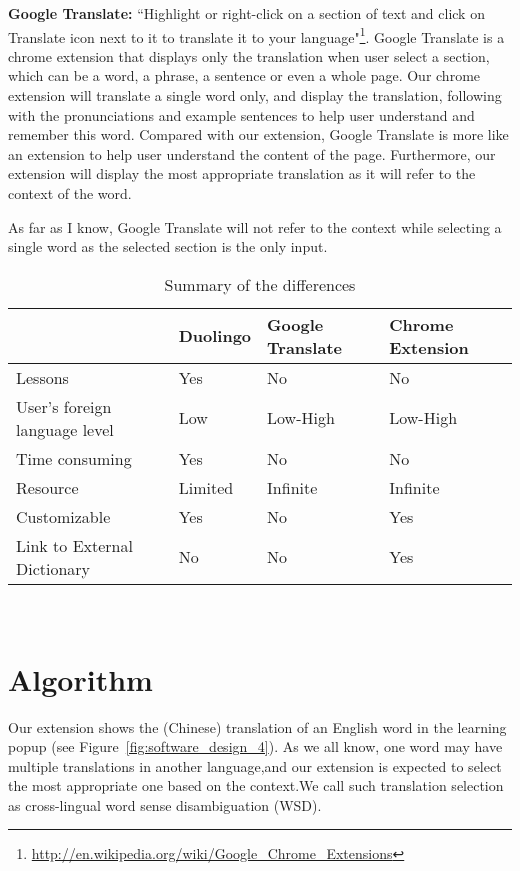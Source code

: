 \documentclass[11pt]{article}
\begin{document}
\textbf{Google Translate:} ``Highlight or right-click on a section of text and click on Translate icon next to it to translate it to your 
language"\footnote{\url{http://en.wikipedia.org/wiki/Google_Chrome_Extensions}}. %
Google Translate is a chrome extension that displays only the translation when user select a section, which can be a word, a phrase, a 
sentence or even a whole page. Our chrome extension will translate a single word only, and display the translation, following with the 
pronunciations and example sentences to help user understand and remember this word. Compared with our extension, Google Translate is more 
like an extension to help user understand the content of the page. Furthermore, our extension will display the most appropriate translation 
as it will refer to the context of the word.

As far as I know, Google Translate will not refer to the context while selecting a single word as the selected section is the only input.
\\
\begin{table}[ht]
  \caption{Summary of the differences}
  \label{table:difference_summary}
  \begin{center}
  \begin{tabular}{| p{2.4cm} | p{1.2cm} | p{1.2cm} |  p{1.2cm} |}
    \hline
    & Duolingo & Google Translate & Chrome Extension \\
    \hline
    Lessons & Yes & No & No \\
    \hline
    User's foreign language level & Low & Low-High & Low-High \\
    \hline
    Time consuming & Yes & No & No\\
    \hline
    Resource & Limited & Infinite & Infinite \\
    \hline
    Customizable & Yes & No & Yes \\
    \hline
    Link to External Dictionary & No & No & Yes \\
    \hline
  \end{tabular}
  \end{center}
\end{table}
\\

\section{Algorithm}
Our extension shows the (Chinese) translation of an English word in the learning popup (see Figure~\ref{fig:software_design_4}). As we all know, one word may have multiple translations in another language,and our extension is expected to select the most appropriate one based on the context.We call such translation selection as cross-lingual word sense disambiguation (WSD).
\end{document}
